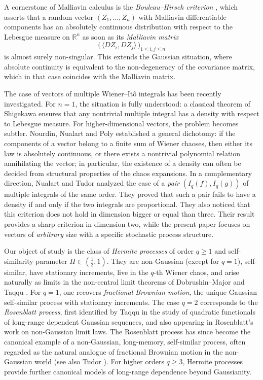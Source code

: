 \documentclass[a4paper,10pt]{article}
\theoremstyle{definition}
\theoremstyle{plain}
\newcommand{\R}{\mathbb{R}}
\newcommand\1{\mathbbm{1}}
\begin{document}
A cornerstone of Malliavin calculus is the \emph{Bouleau--Hirsch criterion} \cite{BouleauHirsch1984}, which asserts that a random vector 
$(Z_1,\dots,Z_n)$
with Malliavin differentiable components has an absolutely continuous distribution with respect to the Lebesgue measure on $\R^n$ as soon as its \emph{Malliavin matrix}
\[
\Big(\,\langle D Z_i,D Z_j\rangle\,\Big)_{1\le i,j\le n}
\]
is almost surely non-singular. This extends the Gaussian situation, where absolute continuity is equivalent to the non-degeneracy of the covariance matrix, which in that case coincides with the Malliavin matrix.

 \medskip

The case of vectors of multiple Wiener--Itô integrals has been recently investigated. For $n=1$, the situation is fully understood: a classical theorem of Shigekawa \cite{Shigekawa} ensures that any nontrivial multiple integral has a density with respect to Lebesgue measure. For higher-dimensional vectors, the problem becomes subtler. Nourdin, Nualart and Poly \cite{NNP} established a general dichotomy: if the components of a vector belong to a finite sum of Wiener chaoses, then either its law is absolutely continuous, or there exists a nontrivial polynomial relation annihilating the vector; in particular, the existence of a density can often be decided from structural properties of the chaos expansions. In a complementary direction, Nualart and Tudor \cite{NT} analyzed the case of a \emph{pair} $(I_q(f),I_q(g))$ of multiple integrals of the same order. They proved that such a pair fails to have a density if and only if the two integrals are proportional. They also noticed that this criterion does not hold in dimension bigger or equal than three. Their result provides a sharp criterion in dimension two, while the present paper focuses on vectors of  \emph{arbitrary} size with a specific stochastic process structure.


 \medskip
 
Our object of study is the class of \emph{Hermite processes} of order $q\ge1$ and self-similarity parameter $H\in(\frac12,1)$. They are non-Gaussian (except for $q=1$), self-similar, have stationary increments, live in the $q$-th Wiener chaos, and arise naturally as limits in the non-central limit theorems of Dobrushin--Major \cite{DM} and Taqqu \cite{Taqqu79}. For $q=1$, one recovers \emph{fractional Brownian motion}, the unique Gaussian self-similar process with stationary increments. The case $q=2$ corresponds to the \emph{Rosenblatt process}, first identified by Taqqu \cite{Taqqu75} in the study of quadratic functionals of long-range dependent Gaussian sequences, and also appearing in Rosenblatt’s work \cite{Rosenblatt} on non-Gaussian limit laws. The Rosenblatt process has since become the canonical example of a non-Gaussian, long-memory, self-similar process, often regarded as the natural analogue of fractional Brownian motion in the non-Gaussian world (see also Tudor \cite{Tudor08}). For higher orders $q\ge 3$, Hermite processes provide further canonical models of long-range dependence beyond Gaussianity.  
\end{document}
